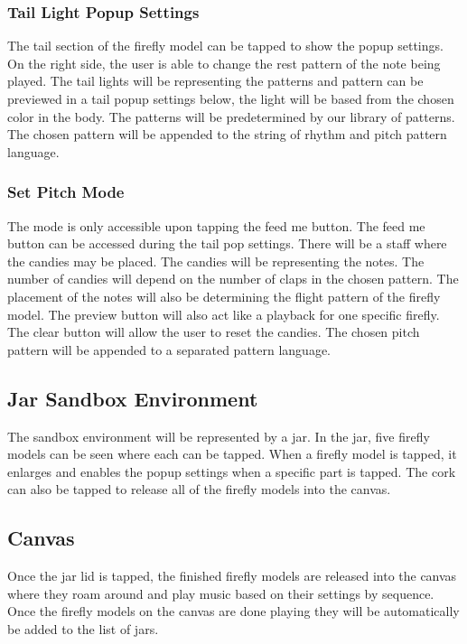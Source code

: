 \subsubsection{Tail Light Popup Settings}
The tail section of the firefly model can be tapped to show the popup settings. On the right side, the user is able to change the rest pattern of the note being played. The tail lights will be representing the patterns and pattern can be previewed in a tail popup settings below, the light will be based from the chosen color in the body. The patterns will be predetermined by our library of patterns. The chosen pattern will be appended to the string of rhythm and pitch pattern language.

\subsubsection{Set Pitch Mode}
The mode is only accessible upon tapping the feed me button. The feed me button can be accessed during the tail pop settings. There will be a staff where the candies may be placed. The candies will be representing the notes. The number of candies will depend on the number of claps in the chosen pattern. The placement of the notes will also be determining the flight pattern of the firefly model. The preview button will also act like a playback for one specific firefly. The clear button will allow the user to reset the candies. The chosen pitch pattern will be appended to a separated pattern language.

\subsection{Jar Sandbox Environment}
The sandbox environment will be represented by a jar. In the jar, five firefly models can be seen where each can be tapped. When a firefly model is tapped, it enlarges and enables the popup settings when a specific part is tapped. The cork can also be tapped to release all of the firefly models into the canvas.

\subsection{Canvas}
Once the jar lid is tapped, the finished firefly models are released into the canvas where they roam around and play music based on their settings by sequence. Once the firefly models on the canvas are done playing they will be automatically be added to the list of jars.


